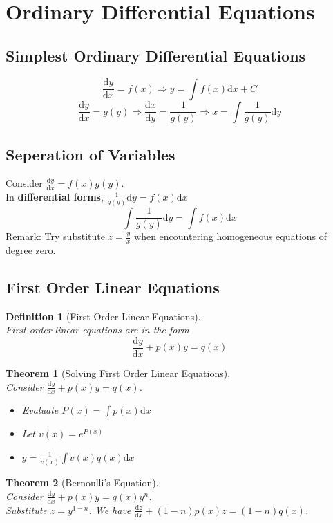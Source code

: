 \documentclass[12pt]{article}
\newcommand{\diff}{\mathrm{d}}
\newtheorem{definition}{Definition}[section]
\newtheorem{theorem}{Theorem}[section]
\theoremstyle{definition}
\begin{document}
\section{Ordinary Differential Equations}
\subsection{Simplest Ordinary Differential Equations}
\[
\frac{\diff y}{\diff x}=f(x)\Rightarrow y=\int f(x)\diff x + C
\]
\[
\frac{\diff y}{\diff x}=g(y)\Rightarrow \frac{\diff x}{\diff y}=\frac{1}{g(y)}\Rightarrow x=\int\frac{1}{g(y)}\diff y
\]
\subsection{Seperation of Variables}
Consider $\frac{\diff y}{\diff x} = f(x)g(y)$.\\
In \textbf{differential forms}, $\frac{1}{g(y)}\diff y = f(x)\diff x$\\
\[
\int \frac{1}{g(y)}\diff y =\int f(x)\diff x
\]
Remark: Try substitute $z=\frac{y}{x}$ when encountering homogeneous equations of degree zero.
\subsection{First Order Linear Equations}
\begin{definition}[First Order Linear Equations]
\hfill\\
\normalfont First order linear equations are in the form
\[
\frac{\diff y}{\diff x}+p(x)y=q(x)
\]
\end{definition}
\begin{theorem}[Solving First Order Linear Equations]
\hfill\\
\normalfont Consider $\frac{\diff y}{\diff x}+p(x)y=q(x)$.
\begin{itemize}
\item Evaluate $P(x) = \int p(x)\diff x$
\item Let $v(x) = e^{P(x)}$
\item $y =\frac{1}{v(x)}\int v(x)q(x)\diff x$
\end{itemize}
\end{theorem}
\begin{theorem}[Bernoulli's Equation]
\hfill\\
\normalfont Consider $\frac{\diff y}{\diff x}+p(x)y=q(x)y^n$.\\
Substitute $z=y^{1-n}$. We have $\frac{\diff z}{\diff x}+(1-n)p(x)z=(1-n)q(x)$.
\end{theorem}
\clearpage
\end{document}
